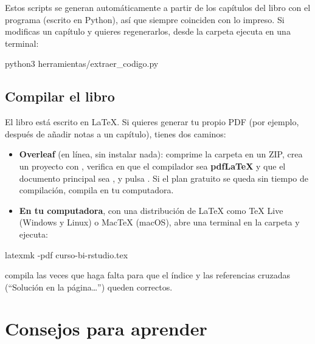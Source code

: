 Estos scripts se generan automáticamente a partir de los capítulos del
libro con el programa  (escrito en
Python), así que siempre coinciden con lo impreso. Si modificas un capítulo
y quieres regenerarlos, desde la carpeta  ejecuta en una
terminal:

\begin{textocodigo}
python3 herramientas/extraer_codigo.py
\end{textocodigo}

\subsection{Compilar el libro}

El libro está escrito en \LaTeX{}. Si quieres generar tu propio PDF (por
ejemplo, después de añadir notas a un capítulo), tienes dos caminos:

\begin{itemize}
  \item \textbf{Overleaf} (en línea, sin instalar nada): comprime la
        carpeta  en un ZIP, crea un proyecto con
        , verifica en  que el
        compilador sea \textbf{pdfLaTeX} y que el documento principal sea
        , y pulsa . Si el
        plan gratuito se queda sin tiempo de compilación, compila en tu
        computadora.
  \item \textbf{En tu computadora}, con una distribución de \LaTeX{} como
        TeX Live (Windows y Linux) o MacTeX (macOS), abre una terminal en
        la carpeta  y ejecuta:
\end{itemize}

\begin{textocodigo}
latexmk -pdf curso-bi-rstudio.tex
\end{textocodigo}

 compila las veces que haga falta para que el índice y las
referencias cruzadas (``Solución en la página\ldots'') queden correctos.

\section{Consejos para aprender}
\label{sec:m0-consejos}


